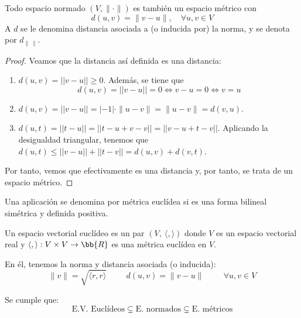 \begin{prop}
    Todo espacio normado $(V,\|\cdot\|)$ es también un espacio métrico con $$d(u,v)=\|v-u\|,\quad \forall u,v\in V$$
    A $d$ se le denomina distancia asociada a (o inducida por) la norma, y se denota por $d_{\|~\|}$.
\end{prop}
\begin{proof}
    Veamos que la distancia así definida es una distancia:
    \begin{enumerate}
        \item $d(u,v)=||v-u||\geq 0$. Además, se tiene que $$d(u,v)=||v-u||=0\Longleftrightarrow v-u=0 \Longleftrightarrow v=u$$
        \item $d(u,v)=||v-u||=|-1|\cdot \|u-v\| = \|u-v\| = d(v,u)$.
        \item $d(u,t)=||t-u|| = ||t-u+v-v|| = ||v-u +t-v||$. Aplicando la desigualdad triangular, tenemos que $d(u,t)\leq ||v-u|| + ||t-v|| = d(u,v) + d(v,t)$.
    \end{enumerate}
    Por tanto, vemos que efectivamente es una distancia y, por tanto, se trata de un espacio métrico.
\end{proof}

\begin{definicion}
    Una aplicación se denomina por métrica euclídea si es una forma bilineal simétrica y definida positiva.
\end{definicion}

\begin{definicion} Un espacio vectorial euclídeo es un par $(V,~\langle,\rangle)$ donde $V$ es un espacio vectorial real y $\langle,\rangle:V\times V\to \bb{R}$ es una métrica euclídea en $V$.

En él, tenemos la norma y distancia asociada (o inducida):
$$\|v\|=\sqrt{\langle r,r\rangle}\hspace{1cm}d(u,v)=\|v-u\| \hspace{1cm} \forall u,v\in V$$
\end{definicion}

\begin{observacion}
    Se cumple que:
    \begin{equation*}
        \text{E.V. Euclídeos} \subsetneq
        \text{E. normados} \subsetneq
        \text{E. métricos}
    \end{equation*}
\end{observacion}

